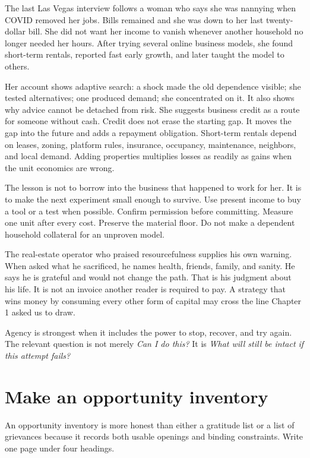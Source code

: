 The last Las Vegas interview follows a woman who says she was nannying when
COVID removed her jobs. Bills remained and she was down to her last
twenty-dollar bill. She did not want her income to vanish whenever another household
no longer needed her hours. After trying several online business models, she
found short-term rentals, reported fast early growth, and later taught the
model to others.

Her account shows adaptive search: a shock made the old dependence visible;
she tested alternatives; one produced demand; she concentrated on it. It also
shows why advice cannot be detached from risk. She suggests business credit as
a route for someone without cash. Credit does not erase the starting gap. It
moves the gap into the future and adds a repayment obligation. Short-term
rentals depend on leases, zoning, platform rules, insurance, occupancy,
maintenance, neighbors, and local demand. Adding properties multiplies losses
as readily as gains when the unit economics are wrong.

The lesson is not to borrow into the business that happened to work for her.
It is to make the next experiment small enough to survive. Use present income
to buy a tool or a test when possible. Confirm permission before committing.
Measure one unit after every cost. Preserve the material floor. Do not make a
dependent household collateral for an unproven model.

The real-estate operator who praised resourcefulness supplies his own warning.
When asked what he sacrificed, he names health, friends, family, and sanity. He
says he is grateful and would not change the path. That is his judgment about
his life. It is not an invoice another reader is required to pay. A strategy
that wins money by consuming every other form of capital may cross the line
Chapter 1 asked us to draw.

Agency is strongest when it includes the power to stop, recover, and try again.
The relevant question is not merely \emph{Can I do this?} It is \emph{What will
still be intact if this attempt fails?}

\section{Make an opportunity inventory}

An opportunity inventory is more honest than either a gratitude list or a list
of grievances because it records both usable openings and binding constraints.
Write one page under four headings.

